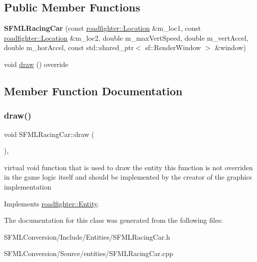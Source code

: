 \subsection*{Public Member Functions}
\begin{DoxyCompactItemize}
\item 
\mbox{\label{classSFMLRacingCar_a88403a7946e3b8c4174bff103110f8c1}} 
{\bfseries S\+F\+M\+L\+Racing\+Car} (const \hyperlink{classroadfighter_1_1Location}{roadfighter\+::\+Location} \&m\+\_\+loc1, const \hyperlink{classroadfighter_1_1Location}{roadfighter\+::\+Location} \&m\+\_\+loc2, double m\+\_\+max\+Vert\+Speed, double m\+\_\+vert\+Accel, double m\+\_\+hor\+Accel, const std\+::shared\+\_\+ptr$<$ sf\+::\+Render\+Window $>$ \&window)
\item 
void \hyperlink{classSFMLRacingCar_a2b1c8b9ad2b80c9e18990cb078d2d62d}{draw} () override
\end{DoxyCompactItemize}


\subsection{Member Function Documentation}
\mbox{\label{classSFMLRacingCar_a2b1c8b9ad2b80c9e18990cb078d2d62d}} 
\subsubsection{\texorpdfstring{draw()}{draw()}}
{\footnotesize\ttfamily void S\+F\+M\+L\+Racing\+Car\+::draw (\begin{DoxyParamCaption}{ }\end{DoxyParamCaption})\hspace{0.3cm}{\ttfamily [override]}, {\ttfamily [virtual]}}

virtual void function that is used to draw the entity this function is not overriden in the game logic itself and should be implemented by the creator of the graphics implementation 

Implements \hyperlink{classroadfighter_1_1Entity_ac516f8005f969ad5a86c252e5a3640ee}{roadfighter\+::\+Entity}.



The documentation for this class was generated from the following files\+:\begin{DoxyCompactItemize}
\item 
S\+F\+M\+L\+Conversion/\+Include/\+Entities/S\+F\+M\+L\+Racing\+Car.\+h\item 
S\+F\+M\+L\+Conversion/\+Source/entities/S\+F\+M\+L\+Racing\+Car.\+cpp\end{DoxyCompactItemize}
